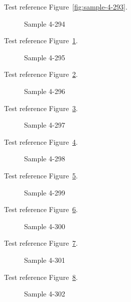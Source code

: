 Test reference Figure~\ref{fig:sample-4-293}.

\begin{figure}[tbhp]
\caption{Sample 4-294}
\label{fig:sample-4-294}
\end{figure}

Test reference Figure~\ref{fig:sample-4-294}.

\begin{figure}[tbhp]
\caption{Sample 4-295}
\label{fig:sample-4-295}
\end{figure}

Test reference Figure~\ref{fig:sample-4-295}.

\begin{figure}[tbhp]
\caption{Sample 4-296}
\label{fig:sample-4-296}
\end{figure}

Test reference Figure~\ref{fig:sample-4-296}.

\begin{figure}[tbhp]
\caption{Sample 4-297}
\label{fig:sample-4-297}
\end{figure}

Test reference Figure~\ref{fig:sample-4-297}.

\begin{figure}[tbhp]
\caption{Sample 4-298}
\label{fig:sample-4-298}
\end{figure}

Test reference Figure~\ref{fig:sample-4-298}.

\begin{figure}[tbhp]
\caption{Sample 4-299}
\label{fig:sample-4-299}
\end{figure}

Test reference Figure~\ref{fig:sample-4-299}.

\begin{figure}[tbhp]
\caption{Sample 4-300}
\label{fig:sample-4-300}
\end{figure}

Test reference Figure~\ref{fig:sample-4-300}.

\begin{figure}[tbhp]
\caption{Sample 4-301}
\label{fig:sample-4-301}
\end{figure}

Test reference Figure~\ref{fig:sample-4-301}.

\begin{figure}[tbhp]
\caption{Sample 4-302}
\label{fig:sample-4-302}
\end{figure}

